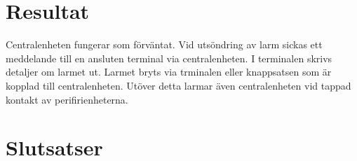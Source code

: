 \documentclass[a4paper]{article}
\begin{document}
\section{Resultat}
Centralenheten fungerar som förväntat. Vid utsöndring av larm sickas ett meddelande till en ansluten terminal via centralenheten. I terminalen skrivs detaljer om larmet ut. Larmet bryts via trminalen eller knappsatsen som är kopplad till centralenheten. Utöver detta larmar även centralenheten vid tappad kontakt av perifirienheterna. 


\section{Slutsatser}




\end{document}
